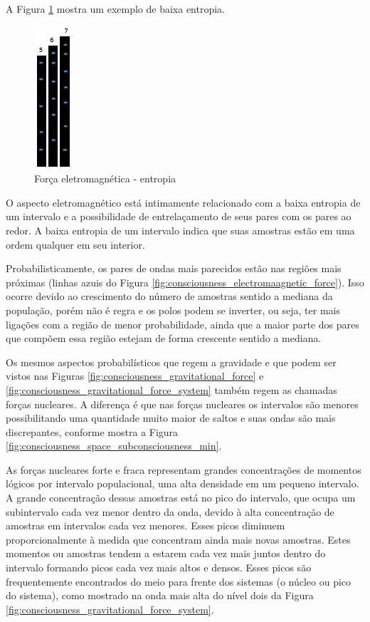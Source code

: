 A Figura \ref{fig:consciousness_electromaagnetic_force_entropy} mostra um exemplo de baixa entropia. 
	\begin{figure}[H]
	\caption{Força eletromagnética - entropia}
	\label{fig:consciousness_electromaagnetic_force_entropy}
	\centering
	\includegraphics[scale=.9]{sections/images/consciousness_electromaagnetic_force_entropy.jpg}
	\end{figure}

O aspecto eletromagnético está intimamente relacionado com a baixa entropia de um intervalo e a possibilidade de entrelaçamento de seus pares com os pares ao redor. A baixa entropia de um intervalo indica que suas amostras estão em uma ordem qualquer em seu interior.

Probabilisticamente, os pares de ondas mais parecidos estão nas regiões mais próximas (linhas azuis do Figura \ref{fig:consciousness_electromaagnetic_force}). Isso ocorre devido ao crescimento do número de amostras sentido a mediana da população, porém não é regra e os polos podem se inverter, ou seja, ter mais ligações com a região de menor probabilidade, ainda que a maior parte dos pares que compõem essa região estejam de forma crescente sentido a mediana.

Os mesmos aspectos probabilísticos que regem a gravidade e que podem ser vistos nas Figuras \ref{fig:consciousness_gravitational_force} e \ref{fig:consciousness_gravitational_force_system} também regem as chamadas forças nucleares. A diferença é que nas forças nucleares os intervalos são menores possibilitando uma quantidade muito maior de saltos e suas ondas são mais discrepantes, conforme mostra a Figura \ref{fig:consciousness_space_subconsciousness_min}.

As forças nucleares forte e fraca representam grandes concentrações de momentos lógicos por intervalo populacional, uma alta densidade em um pequeno intervalo. A grande concentração dessas amostras está no pico do intervalo, que ocupa um subintervalo cada vez menor dentro da onda, devido à alta concentração de amostras em intervalos cada vez menores. Esses picos diminuem proporcionalmente à medida que concentram ainda mais novas amostras. Estes momentos ou amostras tendem a estarem cada vez mais juntos dentro do intervalo formando picos cada vez mais altos e densos. Esses picos são frequentemente encontrados do meio para frente dos sistemas (o núcleo ou pico do sistema), como mostrado na onda mais alta do nível dois da Figura \ref{fig:consciousness_gravitational_force_system}.

